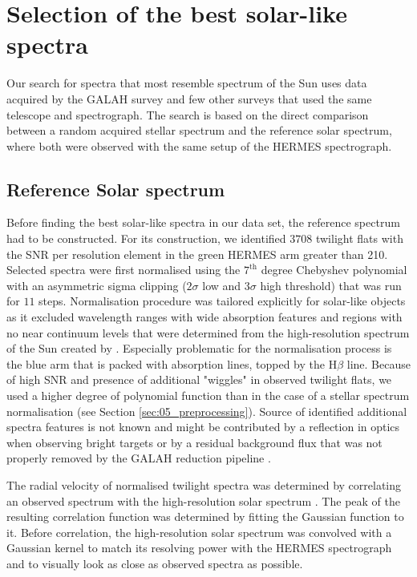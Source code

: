 
\section{Selection of the best solar-like spectra}
\label{sec:05_selection}
Our search for spectra that most resemble spectrum of the Sun uses data acquired by the GALAH survey and few other surveys that used the same telescope and spectrograph. The search is based on the direct comparison between a random acquired stellar spectrum and the reference solar spectrum, where both were observed with the same setup of the HERMES spectrograph.

\subsection{Reference Solar spectrum}
\label{sec:05_reference}
Before finding the best solar-like spectra in our data set, the reference spectrum had to be constructed. For its construction, we identified $3708$ twilight flats with the SNR per resolution element in the green HERMES arm greater than 210. Selected spectra were first normalised using the $7^\text{th}$ degree Chebyshev polynomial with an asymmetric sigma clipping ($2\sigma$ low and $3\sigma$ high threshold) that was run for $11$ steps. Normalisation procedure was tailored explicitly for solar-like objects as it excluded wavelength ranges with wide absorption features and regions with no near continuum levels that were determined from the high-resolution spectrum of the Sun created by \citet{2005MSAIS...8..189K}. Especially problematic for the normalisation process is the blue arm that is packed with absorption lines, topped by the H$\beta$ line. Because of high SNR and presence of additional "wiggles" in observed twilight flats, we used a higher degree of polynomial function than in the case of a stellar spectrum normalisation (see Section \ref{sec:05_preprocessing}). Source of identified additional spectra features is not known and might be contributed by a reflection in optics when observing bright targets or by a residual background flux that was not properly removed by the GALAH reduction pipeline \cite{2017MNRAS.464.1259K}.

The radial velocity of normalised twilight spectra was determined by correlating an observed spectrum with the high-resolution solar spectrum \cite{2005MSAIS...8..189K}. The peak of the resulting correlation function was determined by fitting the Gaussian function to it. Before correlation, the high-resolution solar spectrum was convolved with a Gaussian kernel to match its resolving power with the HERMES spectrograph and to visually look as close as observed spectra as possible. 


